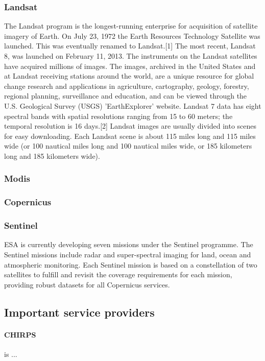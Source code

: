 \subsubsection{Landsat}
The Landsat program is the longest-running enterprise for acquisition of satellite imagery of Earth. On July 23, 1972 the Earth Resources Technology Satellite was launched. This was eventually renamed to Landsat.[1] The most recent, Landsat 8, was launched on February 11, 2013. The instruments on the Landsat satellites have acquired millions of images. The images, archived in the United States and at Landsat receiving stations around the world, are a unique resource for global change research and applications in agriculture, cartography, geology, forestry, regional planning, surveillance and education, and can be viewed through the U.S. Geological Survey (USGS) 'EarthExplorer' website. Landsat 7 data has eight spectral bands with spatial resolutions ranging from 15 to 60 meters; the temporal resolution is 16 days.[2] Landsat images are usually divided into scenes for easy downloading. Each Landsat scene is about 115 miles long and 115 miles wide (or 100 nautical miles long and 100 nautical miles wide, or 185 kilometers long and 185 kilometers wide).

\subsubsection{Modis}

\subsubsection{Copernicus}

\subsubsection{Sentinel}
ESA is currently developing seven missions under the Sentinel programme. The Sentinel missions include radar and super-spectral imaging for land, ocean and atmospheric monitoring. Each Sentinel mission is based on a constellation of two satellites to fulfill and revisit the coverage requirements for each mission, providing robust datasets for all Copernicus services.


\subsection{Important service providers}

\paragraph{CHIRPS} is ...

